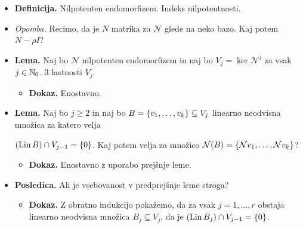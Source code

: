 \begin{enumerate}
    \begin{itemize}
        \item \colorbox{purple!30}{\textbf{Definicija.}} Nilpotenten endomorfizem. Indeks nilpotentnosti.
        \item \colorbox{yellow!30}{\emph{Opomba.}} Recimo, da je $N$ matrika za $\mathcal{N}$ glede na neko bazo. Kaj potem $N - \rho I$?
        \item \colorbox{blue!30}{\textbf{Lema.}} Naj bo $\mathcal{N}$ nilpotenten endomorfizem in naj bo $V_j = \ker \mathcal{N}^j$ za vsak $j \in \mathbb{N}_0$. 3 lastnosti $V_j$.
        \begin{itemize}
            \item \colorbox{green!30}{\textbf{Dokaz.}} Enostavno.
        \end{itemize}     
        \item \colorbox{blue!30}{\textbf{Lema.}} Naj bo $j \geq 2$ in naj bo $B = \left\{v_1, \ldots, v_k\right\} \subseteq V_j$ linearno neodvisna množica za katero velja 
        
        $(\operatorname{Lin} B) \cap V_{j-1} = \left\{0\right\}$. Kaj potem velja za množico $\mathcal{N}(B) = \left\{\mathcal{N}v_1, \ldots, \mathcal{N}v_k\right\}$?
        \begin{itemize}
            \item \colorbox{green!30}{\textbf{Dokaz.}} Enostavno z uporabo prejšnje leme.
        \end{itemize}   
        \item \colorbox{orange!30}{\textbf{Posledica.}} Ali je vsebovanost v predprejšnje leme stroga?
        \begin{itemize}
            \item \colorbox{green!30}{\textbf{Dokaz.}} Z obratno indukcijo pokažemo, da za vsak $j = 1, \ldots, r$ obstaja linearno neodvisna množica $B_j \subseteq V_j$, da je $(\operatorname{Lin} B_j) \cap V_{j-1} = \left\{0\right\}$.
        \end{itemize} 
    \end{itemize}


\end{enumerate}
